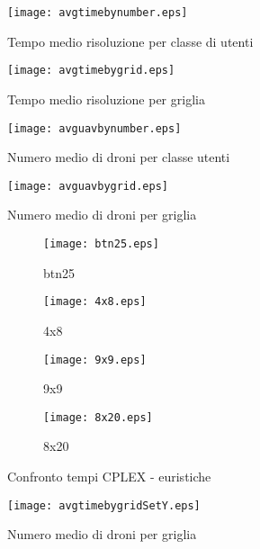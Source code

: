 %
\begin{figure}
	\begin{center}
		\texttt{[image: avgtimebynumber.eps]}
	\end{center}
	\caption{Tempo medio risoluzione per classe di utenti} \label{fig:avgtimebynumber}
\end{figure}
%
%
\begin{figure}
	\begin{center}
		\texttt{[image: avgtimebygrid.eps]}
	\end{center}
	\caption{Tempo medio risoluzione per griglia} \label{fig:avgtimebygrid}
\end{figure}
%
%
\begin{figure}
	\begin{center}
		\texttt{[image: avguavbynumber.eps]}
	\end{center}
	\caption{Numero medio di droni per classe utenti} \label{fig:avguavbynumber}
\end{figure}
%
%
\begin{figure}
	\begin{center}
		\texttt{[image: avguavbygrid.eps]}
	\end{center}
	\caption{Numero medio di droni per griglia} \label{fig:avguavbygrid}
\end{figure}
%
%
\begin{figure}
	\centering
	\begin{subfigure}[b]{0.4\textwidth}
		\centering
		\texttt{[image: btn25.eps]}
		\caption{btn25}
		\label{fig:btn25}
	\end{subfigure}
	\begin{subfigure}[b]{0.4\textwidth}
		\centering
		\texttt{[image: 4x8.eps]}
		\caption{4x8}
		\label{fig:4x8}
	\end{subfigure}
	\begin{subfigure}[b]{0.4\textwidth}
		\centering
		\texttt{[image: 9x9.eps]}
		\caption{9x9}
		\label{fig:9x9}
	\end{subfigure}
	\begin{subfigure}[b]{0.4\textwidth}
		\centering
		\texttt{[image: 8x20.eps]}
		\caption{8x20}
		\label{fig:8x20}
	\end{subfigure}
	\caption{Confronto tempi CPLEX - euristiche}
	\label{fig:mix}
\end{figure}
%
\clearpage
%
\begin{figure}
	\begin{center}
		\texttt{[image: avgtimebygridSetY.eps]}
	\end{center}
	\caption{Numero medio di droni per griglia} \label{fig:avgtimebygridSetY}
\end{figure}
